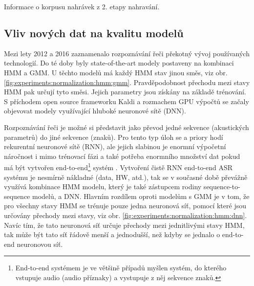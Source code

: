 \begin{table}[htpb]
  \centering
  \def\arraystretch{1.5}
  \caption{Informace o korpusu nahrávek z 2. etapy nahravání.}
  \label{tab:experiments:normalization:recording}
\end{table}

\subsection{Vliv nových dat na kvalitu modelů}
\label{chap:experiments:normalization:quality}

Mezi lety 2012 a 2016 zaznamenalo rozpoznávání řeči překotný vývoj používaných technologií. Do té doby byly state-of-the-art modely postaveny na kombinaci HMM a  GMM. U těchto modelů má každý HMM stav jinou směs, viz obr. \ref{fig:experiments:normalization:hmm:gmm}. Pravděpodobnost přechodu mezi stavy HMM pak určují tyto směsi. Jejich parametry jsou získány na základě trénování. S příchodem open source frameworku Kaldi \cite{Kaldi2011} a rozmachem GPU výpočtů se začaly objevovat modely využívající hluboké neuronové sítě (DNN).

Rozpoznávání řeči je možné si představit jako převod jedné sekvence (akustických parametrů) do jiné sekvence (znaků). Pro tento typ úloh se a priory hodí rekurentní neuronové sítě (RNN), ale jejich slabinou je enormní výpočetní náročnost i mimo trénovací fázi a také potřeba enormního množství dat pokud má být vytvořen end-to-end\footnote{End-to-end systémem je ve většině případů myšlen systém, do kterého vstupuje audio (audio příznaky) a vystupuje z něj sekvence znaků.} systém \cite{Hannun2014}. Vytvoření čistě RNN end-to-end ASR systému je nesmírně nákladné (data, HW, atd.), tak se v současné době převážně využívá kombinace HMM modelu, který je také zástupcem rodiny sequence-to-sequence modelů, a DNN. Hlavním rozdílem oproti modelům s GMM je v tom, že pro všechny stavy HMM se trénuje pouze jedna neuronová síť, pomocí které jsou určovány přechody mezi stavy, viz obr. \ref{fig:experiments:normalization:hmm:dnn}. Navíc tím, že tato neuronová síť určuje  přechody mezi jednitlivými stavy HMM, tak může být tato síť řádově menší a jednodušší, než kdyby se jednalo o end-to-end neuronovou síť.


